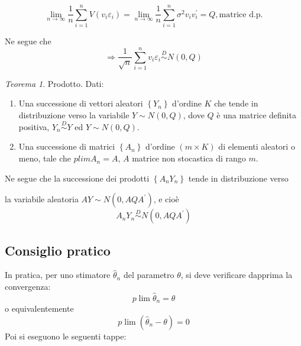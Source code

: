 \documentclass[a4paper]{report}
\newcounter{ese}
\newcounter{def}
\theoremstyle{remark}
\newcounter{theor}
\newtheorem{theorem}[theor]{Teorema}
\begin{document}
\begin{equation*}
\lim_{n\rightarrow \infty }\frac{1}{n}\sum\limits_{i=1}^{n}V(v_{i}%
\varepsilon _{i})=\lim_{n\rightarrow \infty }\frac{1}{n}\sum%
\limits_{i=1}^{n}\sigma ^{2}v_{i}v_{i}^{\prime }=Q,\text{matrice d.p.}
\end{equation*}

Ne segue che%
\begin{equation*}
\Longrightarrow \frac{1}{\sqrt{n}}\sum\limits_{i=1}^{n}v_{i}\varepsilon _{i}%
\overset{D}{\sim }N(0,Q)
\end{equation*}

\begin{theorem}
Prodotto. Dati:
\end{theorem}

\begin{enumerate}
\item Una successione di vettori aleatori $\left\{ Y_{n}\right\} $ d'ordine $%
K$ che tende in distribuzione verso la variabile $Y\sim N(0,Q)$, dove $Q$ 
\`{e} una matrice definita positiva, $Y_{n}\overset{D}{\sim }Y$ ed $Y\sim
N(0,Q)$.

\item Una successione di matrici $\left\{ A_{n}\right\} $ d'ordine $(m\times
K)$ di elementi aleatori o meno, tale che $plimA_{n}=A$, $A$ matrice non
stocastica di rango $m$.
\end{enumerate}

Ne segue che la successione dei prodotti $\left\{ A_{n}Y_{n}\right\} $ tende
in distribuzione verso

la variabile aleatoria $AY\sim N(0,AQA^{\prime })$, e cio\`{e} 
\begin{equation*}
A_{n}Y_{n}\overset{D}{\sim }N(0,AQA^{\prime })
\end{equation*}

\subsection{Consiglio pratico}

In pratica, per uno stimatore $\hat{\theta}_{n}$ del parametro $\theta $, si
deve verificare dapprima la convergenza: 
\begin{equation*}
p\lim \hat{\theta}_{n}=\theta
\end{equation*}%
o equivalentemente 
\begin{equation*}
p\lim (\hat{\theta}_{n}-\theta )=0
\end{equation*}%
Poi si eseguono le seguenti tappe:
\end{document}
